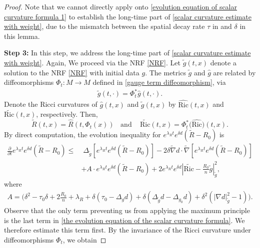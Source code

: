 \documentclass[12pt]{amsart}
\begin{document}
\begin{proof}
Note that we cannot directly apply  onto \eqref{evolution equation of scalar curvature formula 1} to establish the long-time part of \eqref{scalar curvature estimate with weight}, due to the mismatch between the spatial decay rate $\tau$ in  and $\delta$ in this lemma.

\textbf{Step 3:}
In this step, we address the long-time part of \eqref{scalar curvature estimate with weight}. Again, We proceed via the NRF \eqref{NRF}. Let $\tilde{g}(t,x)$ denote a solution to the NRF \eqref{NRF} with initial data $g$. The metrics $\tilde{g}$ and $\hat{g}$ are related by diffeomorphisms $\Phi_t : M \to M$ defined in \eqref{gauge term diffeomorphism}, via
\begin{align}
    \tilde{g}(t, \cdot) = \Phi_t^{*} \hat{g}(t, \cdot).
\end{align}
Denote the Ricci curvatures of $\hat{g}(t,x)$ and $\tilde{g}(t,x)$ by $\hat{\mathrm{Ric}}(t,x)$ and $\tilde{\mathrm{Ric}}(t,x)$, respectively. Then,
\begin{equation}\label{relations of the scalar curvature of NRF and NRDF}
    \tilde{R}(t,x) = \hat{R}(t,\Phi_t(x))\;\; \text{ and }\;\;\;
    \tilde{\mathrm{Ric}}(t,x) = \Phi_t^{*}\bigl(\hat{\mathrm{Ric}}\bigr)(t,x).
\end{equation}
By direct computation, the evolution inequality for $e^{\lambda_R t} e^{\delta d} (\tilde{R} - R_0)$ is 
\begin{equation}\label{the evolution equation of the scalar curvature formula}
    \begin{split}
        \frac{\partial}{\partial t} e^{\lambda_R t}e^{\delta d} (\tilde{R} - R_0) \leq&\; \Delta_{\tilde{g}} \left[ e^{\lambda_R t}e^{\delta d} (\tilde{R} - R_0) \right] - 2\delta \tilde{\nabla}d \cdot \tilde{\nabla} \left[ e^{\lambda_R t}e^{\delta d} (\tilde{R} - R_0) \right]\\ 
        &+ A\cdot e^{\lambda_R t}e^{\delta d}(\tilde{R} - R_0) + 2e^{\lambda_R t} e^{\delta d} \left| \tilde{\mathrm{Ric}} - \frac{R_0}{n}\tilde{g} \right|_{\tilde{g}}^2,
    \end{split}
\end{equation}
where 
\begin{align*}
    A = \big(\delta^2 - \tau_0\delta + 2\frac{R_0}{n} + \lambda_R +  \delta(\tau_0 - \Delta_g d) + \delta(\Delta_{\tilde{g}} d - \Delta_{g_0} d) + \delta^2 (|\nabla d|^2_{\tilde{g}} - 1)\big).
\end{align*}
Observe that the only term preventing us from applying the maximum principle is the last term in \eqref{the evolution equation of the scalar curvature formula}. We therefore estimate this term first. By the invariance of the Ricci curvature under diffeomorphisms $\Phi_t$, we obtain

\end{proof}
\end{document}

